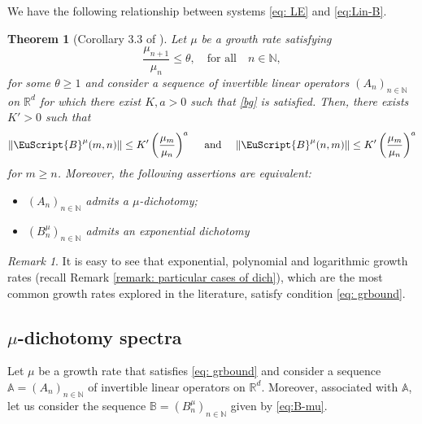 \documentclass[reqno, a4paper, 10pt]{amsart}
\theoremstyle{plain}
\numberwithin{equation}{section}
\newtheorem{theorem}{Theorem}
\theoremstyle{remark}
\newtheorem{remark}{Remark}
\def\N{\mathbb{N}}
\def\cB{\EuScript{B}}
\def\R{\mathbb{R}}
\begin{document}
We have the following relationship between systems \eqref{eq: LE} and \eqref{eq:Lin-B}.
\begin{theorem}[Corollary 3.3 of \cite{DS}] \label{theo: equiv exp mu dich}
Let $\mu$ be a growth rate satisfying 
\begin{equation}\label{eq: grbound}
	\frac{\mu_{n+1}}{\mu_n}\le \theta, \quad \text{for all} \quad n \in \N,
\end{equation} 
for some $\theta\ge 1$ and consider a sequence of invertible linear operators $(A_n)_{n\in \N}$ on $\R^d$ for which there exist $K, a>0$ such that \eqref{bg} is satisfied. Then, there exists $K'>0$ such that
\begin{equation*}
\|\cB ^\mu(m,n)\|\leq K' \left(\frac{\mu_m}{\mu_n}\right)^{a} \quad \text{ and } \quad 
\|\cB ^\mu(n,m)\|\leq K' \left(\frac{\mu_m}{\mu_n}\right)^{a} 
\end{equation*}
for $m\geq n$. Moreover, the following assertions are equivalent:
\begin{itemize}
    \item[i)] $(A_n)_{n\in \N}$ admits a $\mu$-dichotomy;
    \item[ii)] $(B^\mu_n)_{n\in \N}$ admits an exponential dichotomy
\end{itemize}
    
\end{theorem}

\begin{remark}
    It is easy to see that exponential, polynomial and logarithmic growth rates (recall Remark \ref{remark: particular cases of dich}), which are the most common growth rates explored in the literature, satisfy condition \eqref{eq: grbound}. 
\end{remark}













\subsection{$\mu$-dichotomy spectra} 
Let $\mu$ be a growth rate that satisfies \eqref{eq: grbound} and consider a sequence $\mathbb A=(A_n)_{n\in \N}$ of invertible linear operators on $\R^d$. Moreover, associated with $\mathbb A$, let us consider the sequence $\mathbb B=(B^\mu_n)_{n\in \N}$ given by \eqref{eq:B-mu}.
\end{document}
